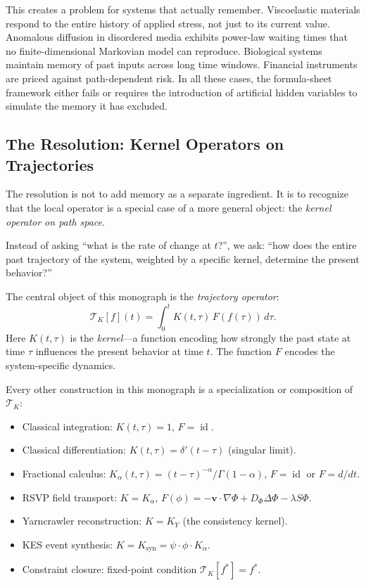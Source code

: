 \documentclass[12pt]{article}
\DeclareMathOperator{\id}{id}
\newcommand{\TK}{\mathcal{T}_K}
\begin{document}
This creates a problem for systems that actually remember. Viscoelastic
materials respond to the entire history of applied stress, not just to its
current value. Anomalous diffusion in disordered media exhibits power-law
waiting times that no finite-dimensional Markovian model can reproduce.
Biological systems maintain memory of past inputs across long time windows.
Financial instruments are priced against path-dependent risk. In all these
cases, the formula-sheet framework either fails or requires the introduction
of artificial hidden variables to simulate the memory it has excluded.

\subsection{The Resolution: Kernel Operators on Trajectories}

The resolution is not to add memory as a separate ingredient. It is to
recognize that the local operator is a special case of a more general object:
the \emph{kernel operator on path space}.

Instead of asking ``what is the rate of change at $t$?'', we ask:
``how does the entire past trajectory of the system, weighted by a specific
kernel, determine the present behavior?''

The central object of this monograph is the \emph{trajectory operator}:
\[
  \TK[f](t) = \int_0^t K(t,\tau)\, F(f(\tau))\, d\tau.
\]
Here $K(t,\tau)$ is the \emph{kernel}---a function encoding how strongly the
past state at time $\tau$ influences the present behavior at time $t$. The
function $F$ encodes the system-specific dynamics.

Every other construction in this monograph is a specialization or composition
of $\TK$:

\begin{itemize}[leftmargin=2em]
  \item Classical integration: $K(t,\tau) = 1$, $F = \id$.
  \item Classical differentiation: $K(t,\tau) = \delta'(t-\tau)$
    (singular limit).
  \item Fractional calculus: $K_\alpha(t,\tau) =
    (t-\tau)^{-\alpha}/\Gamma(1-\alpha)$, $F = \id$ or $F = d/dt$.
  \item RSVP field transport: $K = K_\alpha$, $F(\phi) =
    -\mathbf{v}\cdot\nabla\Phi + D_\Phi\Delta\Phi - \lambda S\Phi$.
  \item Yarncrawler reconstruction: $K = K_Y$ (the consistency kernel).
  \item KES event synthesis: $K = K_{\mathrm{syn}} =
    \psi\cdot\phi\cdot K_\alpha$.
  \item Constraint closure: fixed-point condition $\TK[f^*] = f^*$.
\end{itemize}
\end{document}
